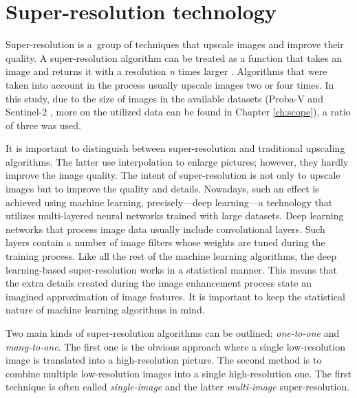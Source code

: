 \section{Super-resolution technology}
Super-resolution is a~group of techniques that upscale images and improve
their quality.
A super-resolution algorithm can be treated as a function that takes an image and returns
it with a resolution \textit{n} times larger \cite{wang-2019-srsurvey}.
Algorithms that were taken into account in the process usually upscale images two or four times.
In this study, due to the size of images in the available datasets (Proba-V \cite{esa-proba} and Sentinel-2 \cite{esa-sentinel}, more on the utilized data can be found in Chapter \ref{ch:scope}), a ratio of three was used.

It is important to distinguish between super-resolution and traditional
upscaling algorithms.
The latter use interpolation to enlarge pictures; however, they hardly improve the image quality.
The intent of super-resolution is not only to upscale images but to improve
the quality and details.
Nowadays, such an effect is achieved using machine learning, precisely---deep
learning---a technology that utilizes multi-layered neural networks trained
with large datasets.
Deep learning networks that process image data usually include convolutional
layers.
Such layers contain a number of image filters whose weights are tuned during the training process.
Like all the rest of the machine learning algorithms, the deep learning-based
super-resolution works in a statistical manner.
This means that the extra details created during the image enhancement process
state an imagined approximation of image features.
It is important to keep the statistical nature of machine learning algorithms
in mind.

Two main kinds of super-resolution algorithms can be outlined:
\textit{one-to-one} and \textit{many-to-one}.
The first one is the obvious approach where a single low-resolution image is
translated into a high-resolution picture.
The second method is to combine multiple low-resolution images into a single high-resolution one.
The first technique is often called \textit{single-image} and the latter \textit{multi-image} super-resolution.


